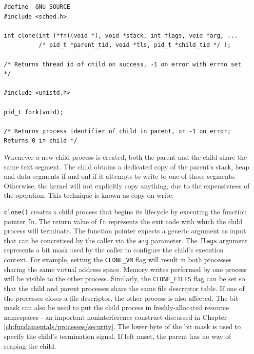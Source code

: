 \begin{lstlisting}[style=syscalls, caption={Clone and Fork System Call Wrappers}]
#define _GNU_SOURCE
#include <sched.h>

int clone(int (*fn)(void *), void *stack, int flags, void *arg, ...
          /* pid_t *parent_tid, void *tls, pid_t *child_tid */ );

/* Returns thread id of child on success, -1 on error with errno set */

#include <unistd.h>

pid_t fork(void);

/* Returns process identifier of child in parent, or -1 on error; Returns 0 in child */

\end{lstlisting}
Whenever a new child process is created, both the parent and the child share the same text segment.
The child obtains a dedicated copy of the parent's stack, heap and data segments if and onl if 
it attempts to write to one of those segments. Otherwise, the kernel will not explicitly copy 
anything, due to the expensivness of the operation. This technique is known as copy on write.

\verb|clone()| creates a child process that begins its lifecycle by executing 
the function pointer \verb|fn|. The return value of \verb|fn| represents the exit code with which 
the child process will terminate. The function pointer expects a generic argument 
as input that can be concretised by the caller via the \verb|arg| parameter.
The \verb|flags| argument represents a bit mask used by the caller to configure 
the child's execution context. For example, setting the \verb|CLONE_VM| flag will result in 
both processes sharing the same virtual address space. Memory writes performed by one process will 
be visible to the other process. Similarly, the \verb|CLONE_FILES| flag can be set so that 
the child and parent processes share the same file descriptor table. If one of the processes 
closes a file descriptor, the other process is also affected. The bit mask can also be used 
to put the child process in freshly-allocated resource namespaces - an important noninterference construct 
discussed in Chapter \ref{ch:fundamentals/processes/security}. The lower byte of the bit mask 
is used to specify the child's termination signal. If left unset, the parent has no way 
of reaping the child.

